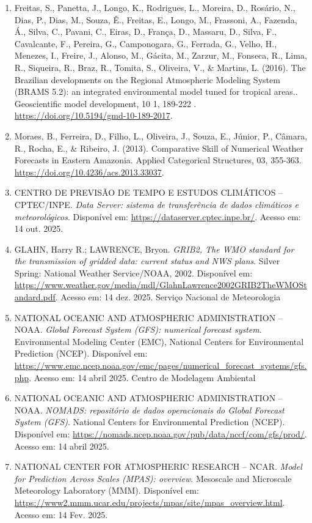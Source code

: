 \documentclass[12pt,a4paper,oneside]{book}
\begin{document}
\begin{enumerate}
\item
  Freitas, S., Panetta, J., Longo, K., Rodrigues, L., Moreira, D., Rosário, N., Dias, P., Dias, M., Souza, Ê., Freitas, E., Longo, M., Frassoni, A., Fazenda, Á., Silva, C., Pavani, C., Eiras, D., França, D., Massaru, D., Silva, F., Cavalcante, F., Pereira, G., Camponogara, G., Ferrada, G., Velho, H., Menezes, I., Freire, J., Alonso, M., Gácita, M., Zarzur, M., Fonseca, R., Lima, R., Siqueira, R., Braz, R., Tomita, S., Oliveira, V., \& Martins, L. (2016). The Brazilian developments on the Regional Atmospheric Modeling System (BRAMS 5.2): an integrated environmental model tuned for tropical areas.. Geoscientific model development, 10 1, 189-222 . \url{https://doi.org/10.5194/gmd-10-189-2017}.
\item
  Moraes, B., Ferreira, D., Filho, L., Oliveira, J., Souza, E., Júnior, P., Câmara, R., Rocha, E., \& Ribeiro, J. (2013). Comparative Skill of Numerical Weather Forecasts in Eastern Amazonia. Applied Categorical Structures, 03, 355-363. \url{https://doi.org/10.4236/acs.2013.33037}.
\item
  CENTRO DE PREVISÃO DE TEMPO E ESTUDOS CLIMÁTICOS -- CPTEC/INPE. \emph{Data Server: sistema de transferência de dados climáticos e meteorológicos}. Disponível em: \url{https://dataserver.cptec.inpe.br/}. Acesso em: 14 out. 2025.
\item
  GLAHN, Harry R.; LAWRENCE, Bryon. \emph{GRIB2, The WMO standard for the transmission of gridded data: current status and NWS plans}. Silver Spring: National Weather Service/NOAA, 2002. Disponível em: \url{https://www.weather.gov/media/mdl/GlahnLawrence2002GRIB2TheWMOStandard.pdf}. Acesso em: 14 dez. 2025. Serviço Nacional de Meteorologia
\item
  NATIONAL OCEANIC AND ATMOSPHERIC ADMINISTRATION -- NOAA. \emph{Global Forecast System (GFS): numerical forecast system}. Environmental Modeling Center (EMC), National Centers for Environmental Prediction (NCEP). Disponível em: \url{https://www.emc.ncep.noaa.gov/emc/pages/numerical_forecast_systems/gfs.php}. Acesso em: 14 abril 2025. Centro de Modelagem Ambiental
\item
  NATIONAL OCEANIC AND ATMOSPHERIC ADMINISTRATION -- NOAA. \emph{NOMADS: repositório de dados operacionais do Global Forecast System (GFS)}. National Centers for Environmental Prediction (NCEP). Disponível em: \url{https://nomads.ncep.noaa.gov/pub/data/nccf/com/gfs/prod/}. Acesso em: 14 abril 2025.
\item
  NATIONAL CENTER FOR ATMOSPHERIC RESEARCH -- NCAR. \emph{Model for Prediction Across Scales (MPAS): overview}. Mesoscale and Microscale Meteorology Laboratory (MMM). Disponível em: \url{https://www2.mmm.ucar.edu/projects/mpas/site/mpas_overview.html}. Acesso em: 14 Fev. 2025.

\end{enumerate}
\end{document}
